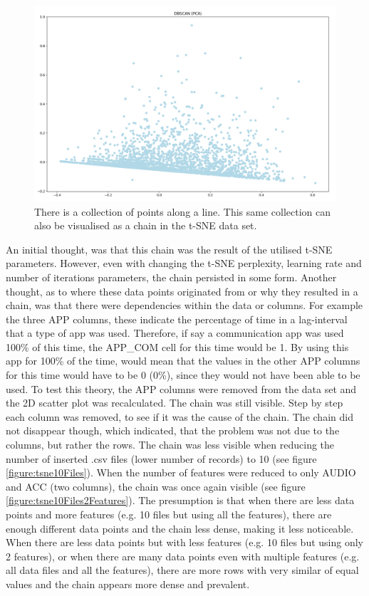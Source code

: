 \begin{figure}[h]
  \centering
  \includegraphics[width=1\textwidth]{./images/pcaChain.png}
  \caption{There is a collection of points along a line. This same collection can also be visualised as a chain in the t-SNE data set.}
  \label{figure:pcaChain}
\end{figure}

An initial thought, was that this chain was the result of the utilised t-SNE parameters. However, even with changing the t-SNE perplexity, learning rate and number of iterations parameters, the chain persisted in some form. Another thought, as to where these data points originated from or why they resulted in a chain, was that there were dependencies within the data or columns. For example the three APP columns, these indicate the percentage of time in a lag-interval that a type of app was used. Therefore, if say a communication app was used 100\% of this time, the APP\_COM cell for this time would be 1. By using this app for 100\% of the time, would mean that the values in the other APP columns for this time would have to be 0 (0\%), since they would not have been able to be used. To test this theory, the APP columns were removed from the data set and the 2D scatter plot was recalculated. The chain was still visible. Step by step each column was removed, to see if it was the cause of the chain. The chain did not disappear though, which indicated, that the problem was not due to the columns, but rather the rows. The chain was less visible when reducing the number of inserted .csv files (lower number of records) to 10 (see figure \ref{figure:tsne10Files}). When the number of features were reduced to only AUDIO and ACC (two columns), the chain was once again visible (see figure \ref{figure:tsne10Files2Features}). The presumption is that when there are less data points and more features (e.g. 10 files but using all the features), there are enough different data points and the chain less dense, making it less noticeable. When there are less data points but with less features (e.g. 10 files but using only 2 features), or when there are many data points even with multiple features (e.g. all data files and all the features), there are more rows with very similar of equal values and the chain appears more dense and prevalent.

